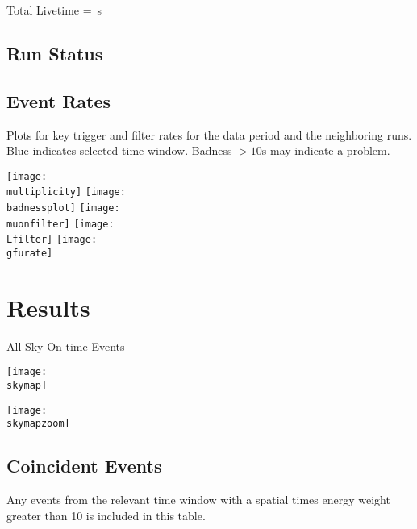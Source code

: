 \documentclass[titlepage]{article}
\begin{document}
Total Livetime = \livetime\,s

\subsection{Run Status}
\runstatustable

\pagebreak
\subsection{Event Rates}
Plots for key trigger and filter rates for the data period
and the neighboring runs.  Blue indicates selected time window.
Badness $>10$s may indicate a problem.

\vspace{1em}
{
 \centering        
 \texttt{[image: \\multiplicity]}
 \texttt{[image: \\badnessplot]}
 \texttt{[image: \\muonfilter]}
 \texttt{[image: \\Lfilter]}
 \texttt{[image: \\gfurate]}
}


%
%
%
%
%
%
%

\pagebreak
\section{Results}

{
  \centering
  {\Large All Sky On-time Events}

  \texttt{[image: \\skymap]}

  \texttt{[image: \\skymapzoom]}
  
}
\pagebreak


\subsection{Coincident Events}
Any events from the relevant time window with a spatial times energy weight greater than 10 is included in this table. 
\event
\end{document}
